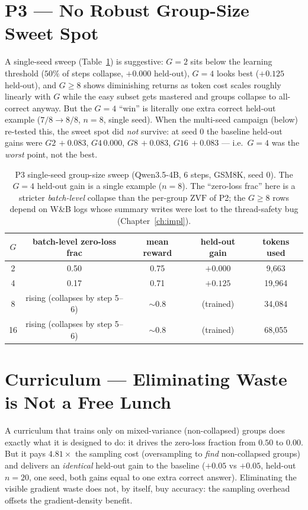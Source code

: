 \documentclass[12pt,a4paper]{report}
\newcommand{\zvf}{\mathrm{ZVF}}
\begin{document}
\section{P3 --- No Robust Group-Size Sweet Spot}
\label{sec:p3}

A single-seed sweep (Table~\ref{tab:p3}) is suggestive: $G{=}2$ sits below the
learning threshold ($50\%$ of steps collapse, $+0.000$ held-out), $G{=}4$ looks best
($+0.125$ held-out), and $G\ge8$ shows diminishing returns as token cost scales
roughly linearly with $G$ while the easy subset gets mastered and groups collapse to
all-correct anyway. But the $G{=}4$ ``win'' is literally one extra correct held-out
example ($7/8 \to 8/8$, $n=8$, single seed). When the multi-seed campaign (below)
re-tested this, the sweet spot did \emph{not} survive: at seed 0 the baseline
held-out gains were $G2\,{+}0.083$, $G4\,{0.000}$, $G8\,{+}0.083$, $G16\,{+}0.083$
--- i.e.\ $G{=}4$ was the \emph{worst} point, not the best.

\begin{table}[t]
\centering
\small
\begin{tabular}{@{}ccccc@{}}
\toprule
$G$ & batch-level zero-loss frac & mean reward & held-out gain & tokens used \\
\midrule
2  & 0.50 & 0.75 & $+0.000$ & 9{,}663 \\
4  & 0.17 & 0.71 & $+0.125$ & 19{,}964 \\
8  & rising (collapses by step 5--6) & ${\sim}0.8$ & (trained) & 34{,}084 \\
16 & rising (collapses by step 5--6) & ${\sim}0.8$ & (trained) & 68{,}055 \\
\bottomrule
\end{tabular}
\caption{P3 single-seed group-size sweep (Qwen3.5-4B, 6 steps, GSM8K, seed 0). The
$G{=}4$ held-out gain is a single example ($n=8$). The ``zero-loss frac'' here is a
stricter \emph{batch-level} collapse than the per-group $\zvf$ of P2; the $G\ge8$
rows depend on W\&B logs whose summary writes were lost to the thread-safety bug
(Chapter~\ref{ch:impl}).}
\label{tab:p3}
\end{table}

\section{Curriculum --- Eliminating Waste is Not a Free Lunch}
A curriculum that trains only on mixed-variance (non-collapsed) groups does exactly
what it is designed to do: it drives the zero-loss fraction from $0.50$ to $0.00$.
But it pays $4.81\times$ the sampling cost (oversampling to \emph{find} non-collapsed
groups) and delivers an \emph{identical} held-out gain to the baseline ($+0.05$ vs
$+0.05$, held-out $n=20$, one seed, both gains equal to one extra correct answer).
Eliminating the visible gradient waste does not, by itself, buy accuracy: the
sampling overhead offsets the gradient-density benefit.
\end{document}
